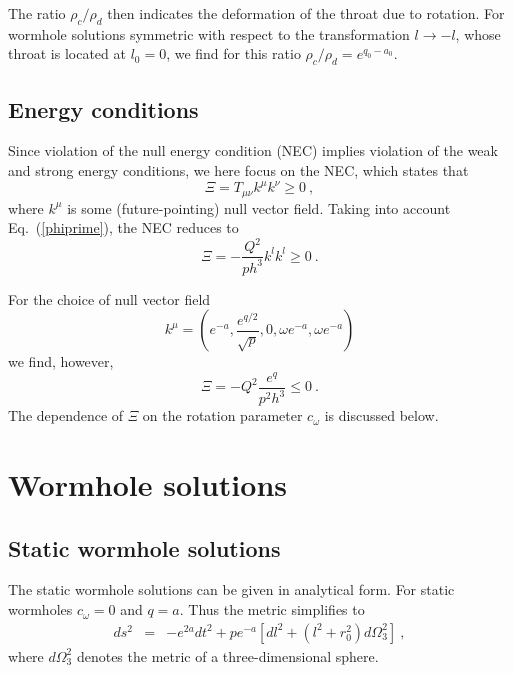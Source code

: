\documentclass[showpacs,preprintnumbers,amsmath,amssymb,floatfix]{revtex4}
\begin{document}
The ratio $\rho_c/\rho_d$ then indicates the deformation of the throat
due to rotation.
For wormhole solutions symmetric with
respect to the transformation $l \to -l$, whose throat is located at
$l_0=0$, we find for this ratio $\rho_c/\rho_d = e^{q_0-a_0}$.



\subsection{Energy conditions}

Since violation of the null energy condition (NEC)
implies violation of the weak and strong energy conditions,
we here focus on the NEC, which states that
\begin{equation}
\Xi = T_{\mu\nu} k^\mu k^\nu \ge 0 \ ,
\end{equation}
where $k^\mu$ is some (future-pointing) null vector field.
Taking into account Eq.~(\ref{phiprime}),
the NEC reduces to
\begin{equation}
\Xi = -\frac{Q^2}{p h^3} k^l k^l \ge 0 \ .
\end{equation}

For the choice of null vector field
\begin{equation}
k^\mu = \left(e^{-a}, \frac{e^{q/2}}{\sqrt{p}}, 0, \omega e^{-a},\omega e^{-a} \right) 
\end{equation}
we find, however,
\begin{equation}
\Xi = - Q^2\frac{e^{q}}{p^2 h^3} \le 0 \ .
\end{equation}
The dependence of $\Xi$ on the rotation parameter $c_\omega$ is discussed below.




\section{Wormhole solutions}
\subsection{Static wormhole solutions}

The static wormhole solutions can be given in analytical form.
For static wormholes $c_\omega=0$ and $q=a$. 
Thus the metric simplifies to
%
\begin{eqnarray}
ds^2 & = &  -e^{2a} dt^2 + p e^{-a}\left[dl^2 +(l^2+r_0^2) d\Omega_3^2\right] \ ,
\label{lineelstat}
\end{eqnarray}
%
where $d\Omega_3^2$ denotes the metric of a three-dimensional sphere.
\end{document}

